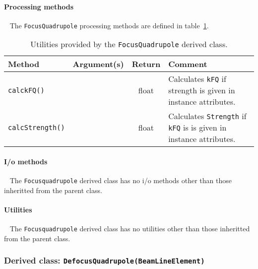 \paragraph{Processing methods} ~\newline
\noindent
The \texttt{FocusQuadrupole} processing methods are defined in
table~\ref{Tab:FQuad:Methods}.
\begin{table}[h]
  \caption{
    Utilities provided by the \texttt{FocusQuadrupole} derived
    class. 
  }
  \label{Tab:FQuad:Methods}
  \begin{center}
    \begin{tabular}{|l|c|c|p{7cm}|}
      \hline
      \textbf{Method} & \textbf{Argument(s)} & \textbf{Return} & \textbf{Comment}                     \\
      \hline
      \texttt{calckFQ()} &  & float & Calculates \texttt{kFQ} if strength is given in instance attributes. \\
      \texttt{calcStrength()} &  & float & Calculates \texttt{Strength} if \texttt{kFQ} is is given in instance attributes. \\
      \hline
    \end{tabular}
  \end{center}
\end{table}

\paragraph{I/o methods} ~\newline
\noindent
The \texttt{Focusquadrupole} derived class has no i/o methods other than
those inheritted from the parent class.

\paragraph{Utilities} ~\newline
\noindent
The \texttt{Focusquadrupole} derived class has no utilities other than those
inheritted from the parent class. 

\FloatBarrier

\subsubsection{Derived class: \texttt{DefocusQuadrupole(BeamLineElement)}}

